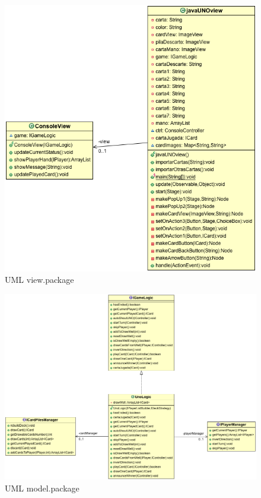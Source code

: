 \documentclass[letterpaper,11pt]{article}
\begin{document}
\begin{figure}[H]
\center
\includegraphics[scale=0.5]{view.png}
\caption{UML view.package}
\end{figure}

\begin{figure}[H]
\center
\includegraphics[scale=0.5]{logic.png}
\caption{UML model.package}
\end{figure}
\end{document}
